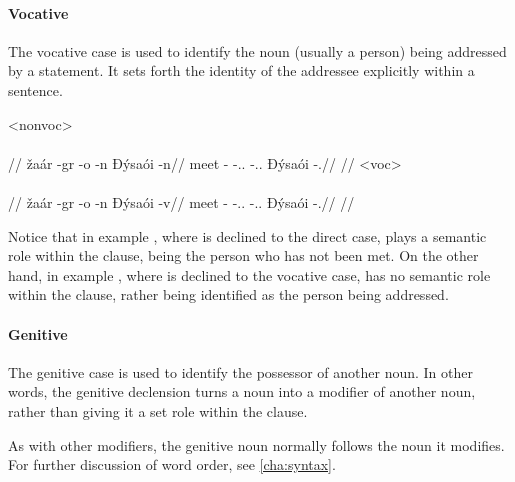 
\paragraph{Vocative}

The vocative case is used to identify the noun (usually a person) being addressed by a statement. It sets forth the identity of the addressee explicitly within a sentence.

	\a<nonvoc>\begingl
		\glpreamble{}\\
		\\
		//
		\gla žaár -gr -o -n Ðýsaói -n//
		\glb meet -\Rtsp{} -\At.\Dir.\Fps{} -\Idr.\Tps.\Prox{} Ðýsaói -\Dir.\Sg//
		\glft {}//
	\endgl
	\a<voc>\begingl
		\glpreamble{}\\
		\\
		//
		\gla žaár -gr -o -n Ðýsaói -v//
		\glb meet -\Rtsp{} -\At.\Dir.\Fps{} -\Idr.\Tps.\Prox{} Ðýsaói -\Voc.\Sg//
		\glft {}//
	\endgl
\xe

Notice that in example , where  is declined to the direct case,  plays a semantic role within the clause, being the person who has not been met. On the other hand, in example , where  is declined to the vocative case,  has no semantic role within the clause, rather being identified as the person being addressed.


\paragraph{Genitive}

The genitive case is used to identify the possessor of another noun. In other words, the genitive declension turns a noun into a modifier of another noun, rather than giving it a set role within the clause.

As with other modifiers, the genitive noun normally follows the noun it modifies. For further discussion of word order, see \autoref{cha:syntax}.


